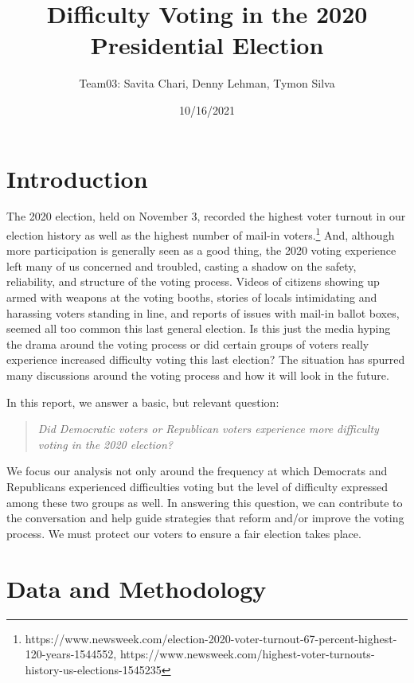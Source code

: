 \documentclass[
]{article}
\title{Difficulty Voting in the 2020 Presidential Election}
\author{Team03: Savita Chari, Denny Lehman, Tymon Silva}
\date{10/16/2021}
\begin{document}
\maketitle

\hypertarget{introduction}{%
\section{Introduction}\label{introduction}}

The 2020 election, held on November 3, recorded the highest voter turnout in our election history as well as the highest number of mail-in voters.\footnote{https://www.newsweek.com/election-2020-voter-turnout-67-percent-highest-120-years-1544552, https://www.newsweek.com/highest-voter-turnouts-history-us-elections-1545235} And, although more participation is generally seen as a good thing, the 2020 voting experience left many of us concerned and troubled, casting a shadow on the safety, reliability, and structure of the voting process. Videos of citizens showing up armed with weapons at the voting booths, stories of locals intimidating and harassing voters standing in line, and reports of issues with mail-in ballot boxes, seemed all too common this last general election. Is this just the media hyping the drama around the voting process or did certain groups of voters really experience increased difficulty voting this last election? The situation has spurred many discussions around the voting process and how it will look in the future.

In this report, we answer a basic, but relevant question:

\begin{quote}
  \textit{Did Democratic voters or Republican voters experience more difficulty voting in the 2020 election?}
\end{quote}

We focus our analysis not only around the frequency at which Democrats and Republicans experienced difficulties voting but the level of difficulty expressed among these two groups as well. In answering this question, we can contribute to the conversation and help guide strategies that reform and/or improve the voting process. We must protect our voters to ensure a fair election takes place.

\hypertarget{data-and-methodology}{%
\section{Data and Methodology}\label{data-and-methodology}}
\end{document}

